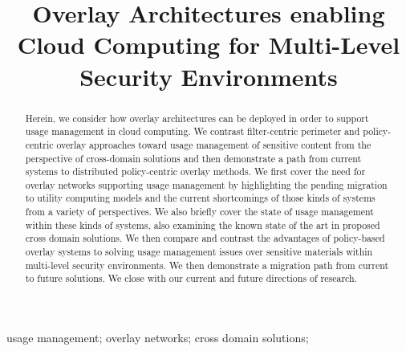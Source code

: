 \documentclass[10pt, conference, compsocconf]{IEEEtran}
\begin{document}
\title{Overlay Architectures enabling Cloud Computing for Multi-Level Security Environments}


\maketitle

\begin{abstract}
Herein,  we consider how overlay architectures can be deployed in order to support usage management in cloud computing.  We contrast filter-centric perimeter and policy-centric overlay approaches toward usage management of sensitive content from the perspective of cross-domain solutions and then demonstrate a path from current systems to distributed policy-centric overlay methods.  We first cover the need for overlay networks supporting usage management by highlighting the pending migration to utility computing models and the current shortcomings of those kinds of systems from a variety of perspectives.  We also briefly cover the state of usage management within these kinds of systems, also examining the known state of the art in proposed cross domain solutions.  We then compare and contrast the advantages of policy-based overlay systems to solving usage management issues over sensitive materials within multi-level security environments. We then demonstrate a migration path from current to future solutions.  We close with our current and future directions of research. 
\end{abstract}

\begin{IEEEkeywords}
usage management; overlay networks; cross domain solutions;

\end{IEEEkeywords}

\IEEEpeerreviewmaketitle




\end{document}
